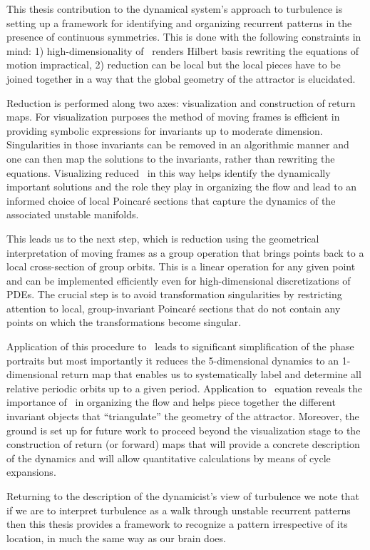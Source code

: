 
This thesis contribution to the dynamical system's approach to
turbulence is setting up a framework for identifying and
organizing recurrent patterns in the presence of continuous
symmetries. This is done with the following
constraints in mind: 1) high-dimensionality of \statesp\ renders
Hilbert basis rewriting the equations of motion impractical, 2) reduction
can be local but the local pieces have to be joined together in
a way that the global geometry of the attractor is elucidated.

Reduction is performed along two axes: visualization and construction of return maps.
For visualization purposes the method of moving frames is efficient in providing
symbolic expressions for invariants up to moderate dimension. Singularities
in those invariants can be removed in an algorithmic manner and one can then map the
solutions to the invariants, rather than rewriting the equations. Visualizing
reduced \statesp\ in this way helps identify the dynamically important solutions and the role they
play in organizing the flow and lead to an informed choice of local Poincar\'e sections
that capture the dynamics of the associated unstable manifolds.

This leads us to the next step, which is reduction using the geometrical interpretation
of moving frames as a group operation that brings points back to a local cross-section of
group orbits. This is a linear operation for any given point and can be implemented efficiently
even for high-dimensional discretizations of PDEs. The crucial step is to avoid transformation
singularities by restricting attention to local, group-invariant Poincar\'e sections that
do not contain any points on which the transformations become singular.

Application of this procedure to \CLe\ leads to significant
simplification of the phase portraits but most importantly it
reduces the 5-dimensional dynamics to an 1-dimensional return
map that enables us to systematically label and determine all
relative periodic orbits up to a given period. Application to
\KS\ equation reveals the importance of \reqva\ in
organizing the flow and helps piece together the different
invariant objects that ``triangulate'' the geometry of the
attractor. Moreover, the ground is set up for future work to
proceed beyond the visualization stage to the construction of
return (or forward) maps that will provide a concrete
description of the dynamics and will allow quantitative
calculations by means of cycle expansions.

Returning to the description of the dynamicist's view of turbulence we note that if we are to
interpret turbulence as a walk through unstable recurrent patterns then this thesis provides
a framework to recognize a pattern irrespective of its location, in much the same way as our brain
does.
